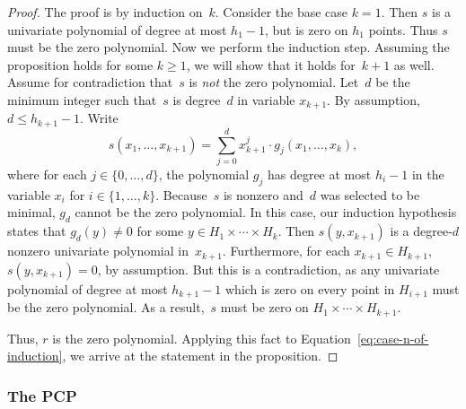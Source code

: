 \documentclass[11pt]{article}
\theoremstyle{definition}
\begin{document}
\begin{proof}
  The proof is by induction on~$k$.
  Consider the base case $k = 1$.
  Then $s$ is a univariate polynomial of degree at most $h_1 - 1$, but is zero
  on $h_1$ points.
  Thus $s$ must be the zero polynomial.
  Now we perform the induction step.
  Assuming the proposition holds for some $k \geq 1$, we will show that it holds
  for~$k+1$ as well.
  Assume for contradiction that~$s$ is \emph{not} the zero polynomial.
  Let~$d$ be the minimum integer such that~$s$ is degree~$d$ in variable
  $x_{k+1}$.
  By assumption, $d \leq h_{k+1} - 1$.
  Write
  \begin{equation*}
    s(x_1, \ldots, x_{k+1}) = \sum_{j=0}^d x_{k+1}^{j} \cdot g_{j}(x_{1},
    \ldots, x_k),
  \end{equation*}
  where for each $j \in \{0, \ldots, d\}$, the polynomial $g_j$ has degree at
  most $h_i-1$ in the variable $x_i$ for $i \in \{1,\ldots,k\}$.
  Because~$s$ is nonzero and~$d$ was selected to be minimal, $g_d$ cannot be the
  zero polynomial.
  In this case, our induction hypothesis states that $g_d(y) \neq 0$ for some $y
  \in H_1 \times \cdots \times H_k$.
  Then $s(y, x_{k+1})$ is a degree-$d$ nonzero univariate polynomial in~$x_{k+1}$.
  Furthermore, for each $x_{k+1} \in H_{k+1}$, $s(y, x_{k+1}) = 0$, by
  assumption.
  But this is a contradiction, as any univariate polynomial of degree at most
  $h_{k+1}-1$ which is zero on every point in $H_{i+1}$ must be the zero
  polynomial.
  As a result,~$s$ must be zero on $H_1 \times \cdots \times H_{k+1}$.
  
  Thus, $r$ is the zero polynomial.
  Applying this fact to Equation~\eqref{eq:case-n-of-induction},
  we arrive at the statement in the proposition.
  \end{proof}

\subsubsection{The PCP}
\label{sec:ar-pcp}
\end{document}
